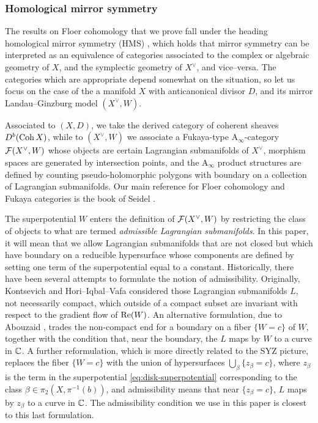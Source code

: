 \documentclass[12pt]{amsart}
\begin{document}


\subsubsection{Homological mirror symmetry}
\label{sec:intro-HMS}

The results on Floer cohomology that we prove fall under the heading
homological mirror symmetry (HMS) \cite{hms}, which holds that mirror
symmetry can be interpreted as an equivalence of categories associated to the complex or algebraic
geometry of $X$, and the symplectic geometry of $X^\vee$, and
vice--versa. The categories which are appropriate depend somewhat on
the situation, so let us focus on the case of the a manifold $X$ with
anticanonical divisor $D$, and its mirror Landau--Ginzburg model
$(X^\vee,W)$. 

Associated to $(X,D)$, we take the derived category of coherent
sheaves $D^b(\operatorname{Coh} X)$, while to $(X^\vee,W)$ we associate a Fukaya-type A$_\infty$-category
$\mathcal{F}(X^\vee,W)$ whose objects are certain Lagrangian submanifolds of
$X^\vee$, morphism spaces are generated by intersection points, and the
A$_\infty$ product structures are defined by counting pseudo-holomorphic
polygons with boundary on a collection of Lagrangian submanifolds. Our
main reference for Floer cohomology and Fukaya categories is the book
of Seidel \cite{seidel-book}.

The superpotential $W$ enters the definition of $\mathcal{F}(X^\vee,W)$ by
restricting the class of objects to what are termed \emph{admissible
  Lagrangian submanifolds}. In this paper, it will mean that we allow Lagrangian submanifolds that are not closed but which have boundary on a reducible hypersurface whose components are defined by setting one term of the superpotential equal to a constant. Historically, there have been several attempts to formulate the notion of admissibility. Originally, 
Kontsevich \cite{kontsevich-notes} and Hori--Iqbal--Vafa \cite{hori-iqbal-vafa} considered those Lagrangian
submanifolds $L$, not necessarily compact, which outside of a compact
subset are invariant with respect to the gradient flow of $\operatorname{Re}(W)$. An
alternative formulation, due to Abouzaid \cite{abouzaid06,abouzaid09},
trades the non-compact end for a boundary on a fiber $\{W = c\}$ of
$W$, together with the condition that, near the boundary, the $L$ maps
by $W$ to a curve in $\mathbb{C}$. A further reformulation, which is more
directly related to the SYZ picture, replaces the fiber $\{W = c\}$
with the union of hypersurfaces $\bigcup_{\beta}\{z_\beta = c\}$, where $z_\beta$ is
the term in the superpotential \eqref{eq:disk-superpotential}
corresponding to the class $\beta \in \pi_2(X,\pi^{-1}(b))$, and
admissibility means that near $\{z_\beta = c\}$, $L$ maps by $z_\beta$
to a curve in $\mathbb{C}$. The admissibility condition we use in this paper is closest to this last formulation.
\end{document}
